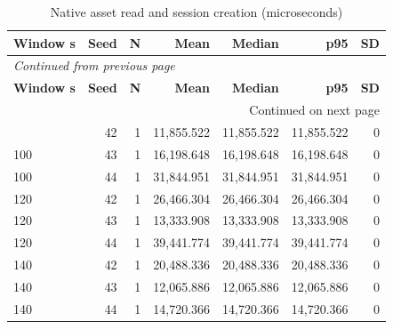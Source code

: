 \documentclass[10pt,a4paper]{article}
\begin{document}
\begin{longtable}{@{}lrrrrrr@{}}
\caption{Native asset read and session creation (microseconds)}\\
\toprule
\textbf{Window s} & \textbf{Seed} & \textbf{N} & \textbf{Mean} & \textbf{Median} & \textbf{p95} & \textbf{SD} \\
\midrule\endfirsthead
\multicolumn{7}{l}{\small\itshape Continued from previous page}\\
\toprule
\textbf{Window s} & \textbf{Seed} & \textbf{N} & \textbf{Mean} & \textbf{Median} & \textbf{p95} & \textbf{SD} \\
\midrule\endhead
\midrule\multicolumn{7}{r}{\small Continued on next page}\\\endfoot
\bottomrule\endlastfoot
100 & 42 & 1 & 11,855.522 & 11,855.522 & 11,855.522 & 0 \\
100 & 43 & 1 & 16,198.648 & 16,198.648 & 16,198.648 & 0 \\
100 & 44 & 1 & 31,844.951 & 31,844.951 & 31,844.951 & 0 \\
120 & 42 & 1 & 26,466.304 & 26,466.304 & 26,466.304 & 0 \\
120 & 43 & 1 & 13,333.908 & 13,333.908 & 13,333.908 & 0 \\
120 & 44 & 1 & 39,441.774 & 39,441.774 & 39,441.774 & 0 \\
140 & 42 & 1 & 20,488.336 & 20,488.336 & 20,488.336 & 0 \\
140 & 43 & 1 & 12,065.886 & 12,065.886 & 12,065.886 & 0 \\
140 & 44 & 1 & 14,720.366 & 14,720.366 & 14,720.366 & 0 \\
\end{longtable}\endgroup
\begingroup\small\setlength{\tabcolsep}{4pt}\renewcommand{\arraystretch}{1.12}
\end{document}
